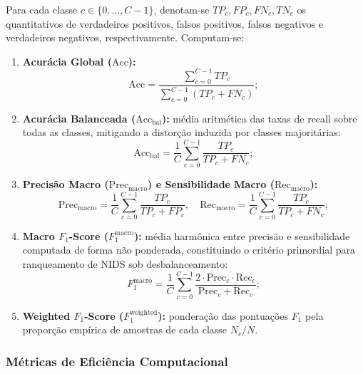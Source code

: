 Para cada classe $c \in \{0, \dots, C-1\}$, denotam-se $TP_c, FP_c, FN_c, TN_c$ os quantitativos de verdadeiros positivos, falsos positivos, falsos negativos e verdadeiros negativos, respectivamente. Computam-se:
\begin{enumerate}
    \item \textbf{Acurácia Global ($\mathrm{Acc}$):}
    \begin{equation}
    \mathrm{Acc} = \frac{\sum_{c=0}^{C-1} TP_c}{\sum_{c=0}^{C-1} (TP_c + FN_c)};
    \end{equation}
    
    \item \textbf{Acurácia Balanceada ($\mathrm{Acc}_{\mathrm{bal}}$):} média aritmética das taxas de recall sobre todas as classes, mitigando a distorção induzida por classes majoritárias:
    \begin{equation}
    \mathrm{Acc}_{\mathrm{bal}} = \frac{1}{C} \sum_{c=0}^{C-1} \frac{TP_c}{TP_c + FN_c};
    \end{equation}
    
    \item \textbf{Precisão Macro ($\mathrm{Prec}_{\mathrm{macro}}$) e Sensibilidade Macro ($\mathrm{Rec}_{\mathrm{macro}}$):}
    \begin{equation}
    \mathrm{Prec}_{\mathrm{macro}} = \frac{1}{C} \sum_{c=0}^{C-1} \frac{TP_c}{TP_c + FP_c}, \quad \mathrm{Rec}_{\mathrm{macro}} = \frac{1}{C} \sum_{c=0}^{C-1} \frac{TP_c}{TP_c + FN_c};
    \end{equation}
    
    \item \textbf{Macro $F_1$-Score ($F_1^{\mathrm{macro}}$):} média harmônica entre precisão e sensibilidade computada de forma não ponderada, constituindo o critério primordial para ranqueamento de NIDS sob desbalanceamento:
    \begin{equation}
    F_1^{\mathrm{macro}} = \frac{1}{C} \sum_{c=0}^{C-1} \frac{2 \cdot \mathrm{Prec}_c \cdot \mathrm{Rec}_c}{\mathrm{Prec}_c + \mathrm{Rec}_c};
    \end{equation}
    
    \item \textbf{Weighted $F_1$-Score ($F_1^{\mathrm{weighted}}$):} ponderação das pontuações $F_1$ pela proporção empírica de amostras de cada classe $N_c / N$.
\end{enumerate}

\subsubsection{Métricas de Eficiência Computacional}

